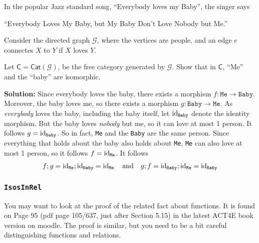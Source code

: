 In the popular Jazz standard song, ``Everybody loves my Baby'', the singer says
\begin{center}
  ``Everybody Loves My Baby, but My Baby Don't Love Nobody but Me.''
\end{center}
Consider the directed graph $\mathcal{G}$, where the vertices are people, and an edge $e$ connectes $X$ to $Y$ if $X$ loves $Y$.

Let $\textsf{C} = \textsf{Cat}(\mathcal{G})$, be the free category generated by $\mathcal{G}$.
Show that in $\textsf{C}$, ``Me'' and the ``baby'' are isomorphic.

\textbf{Solution:}
Since everybody loves the baby, there exists a morphism $f: \texttt{Me} \to \texttt{Baby}$.
Moreover, the baby loves me, so there exists a morphism $g: \texttt{Baby} \to \texttt{Me}$.
As \emph{everybody} loves the baby, including the baby itself, let $\operatorname{id}_{\texttt{Baby}}$ denote the identity morphism.
But the baby loves \emph{nobody} but me, so it can love at most 1 person. It follows $g = \operatorname{id}_{\texttt{Baby}}$.
So in fact, \texttt{Me} and the \texttt{Baby} are the same person.
Since everything that holds about the baby also holds about \texttt{Me}, \texttt{Me} can also love at most 1 person, so it follows $f = \operatorname{id}_{\texttt{Me}}$.
It follows
\begin{align*}
  f;g = \operatorname{id}_{\texttt{Me}} ; \operatorname{id}_\texttt{Baby} = \operatorname{id}_{\texttt{Me}}
  \quad \text{and} \quad 
  g;f = \operatorname{id}_{\texttt{Baby}} ; \operatorname{id}_\texttt{Me} = \operatorname{id}_{\texttt{Baby}}
\end{align*}


\subsubsection{\texttt{IsosInRel}}
You may want to look at the proof of the related fact about functions. It is found on Page 95 (pdf page 105/637, just after Section 5.15) in the latest ACT4E book version on moodle.
The proof is similar, but you need to be a bit careful distinguishing functions and relations.










